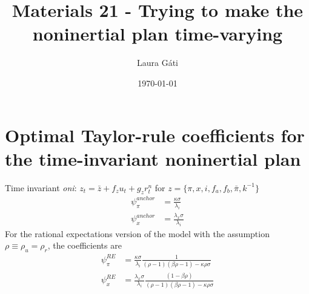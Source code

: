 \documentclass[11pt]{article}
\renewcommand{\[}{\begin{equation}}
\renewcommand{\]}{\end{equation}}
\begin{document}
\linespread{1.0}

\title{Materials 21 - Trying to make the noninertial plan time-varying}
\author{Laura G\'ati} 
\date{\today}
\maketitle


\tableofcontents


\section{Optimal Taylor-rule coefficients for the time-invariant noninertial plan}
Time invariant \emph{oni}: $z_t = \bar{z} + f_z u_t + g_z r_t^n$ for $z = \{\pi,x,i, f_a, f_b, \bar{\pi}, k^{-1}\}$
\begin{align}
\psi_{\pi}^{anchor} & = \frac{\kappa  \sigma }{\lambda_i} \label{opt_psipi_anchor}
\\
\psi_{x}^{anchor} & =  \frac{\lambda_x\sigma }{\lambda_i } \label{opt_psix_anchor}
\end{align}
For the rational expectations version of the model with the assumption $\rho \equiv \rho_u = \rho_r$, the coefficients are
\begin{align}
\psi_{\pi}^{RE} & = \frac{\kappa  \sigma }{\lambda_i}   \frac{1 }{(\rho -1) (\beta  \rho -1)-\kappa   \rho  \sigma } \label{opt_psipi_RE}
\\
\psi_{x}^{RE} & =  \frac{\lambda_x\sigma }{\lambda_i }   \frac{ (1-\beta  \rho )}{ (\rho -1) (\beta  \rho -1)-\kappa   \rho  \sigma } \label{opt_psix_RE}
\end{align}
\end{document}
